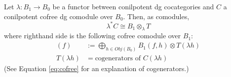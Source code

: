%
%
\begin{prop}\label{prop:compute_pb}
Let $\lambda:B_1 \to B_0$ be a functor 
between conilpotent dg cocategories and 
$C$ a conilpotent cofree dg comodule 
over $B_0$. 
Then, as comodules,
\begin{equation}\label{eq:compute_pb}
\lambda^*C \cong 
B_1 \otimes_{\lambda} T 
\end{equation}
where righthand side is the following 
cofree comodule over $B_1$:
\begin{align*}
[B_1 \otimes_{\lambda} T](f)
&:= 
\bigoplus \limits_{h \in Obj(B_0)}
B_1(f, h) \otimes T(\lambda h)\\
T(\lambda h)
&=
\textrm{cogenerators of }C(\lambda h)
\end{align*}
(See Equation \ref{eq:cofree} 
for an explanation of cogenerators.)
\end{prop}
%
